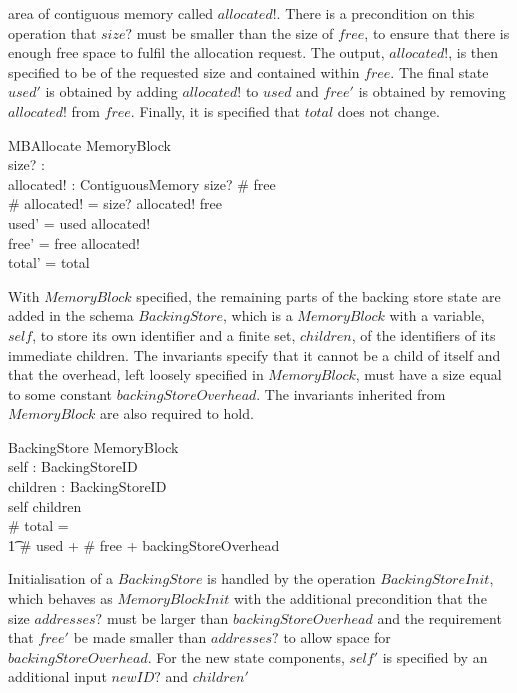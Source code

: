 \documentclass[a4paper,10pt]{article}
\begin{document}
area of contiguous memory called $allocated!$. There is a precondition on this
operation that $size?$ must be smaller than the size of $free$, to ensure that
there is enough free space to fulfil the allocation request. The output,
$allocated!$, is then specified to be of the requested size and contained within
$free$. The final state $used'$ is obtained by adding $allocated!$ to $used$ and
$free'$ is obtained by removing $allocated!$ from $free$. Finally, it is
specified that $total$ does not change.
%
\begin{schema}{MBAllocate}
  \Delta MemoryBlock \\
  size? : \nat \\
  allocated! : ContiguousMemory
\where
  size? \leq \# free \\
  \# allocated! = size? \land allocated! \subseteq free \\
  used' = used \cup allocated! \\
  free' = free \setminus allocated! \\
  total' = total \\
\end{schema}
%
With $MemoryBlock$ specified, the remaining parts of the backing store state are
added in the schema $BackingStore$, which is a $MemoryBlock$ with a variable,
$self$, to store its own identifier and a finite set, $children$, of the
identifiers of its immediate children. The invariants specify that it cannot be
a child of itself and that the overhead, left loosely specified in
$MemoryBlock$, must have a size equal to some constant
$backingStoreOverhead$. The invariants inherited from $MemoryBlock$ are also
required to hold.
%
\begin{schema}{BackingStore}
	MemoryBlock \\
  	self : BackingStoreID \\
  	children : \finset BackingStoreID \\
\where
 	self \notin children \\
 	\# total = \\
        \t1 \# used + \# free + backingStoreOverhead
\end{schema}
%
Initialisation of a $BackingStore$ is handled by the operation
$BackingStoreInit$, which behaves as $MemoryBlockInit$ with the additional
precondition that the size $addresses?$ must be larger than
$backingStoreOverhead$ and the requirement that $free'$ be made smaller than
$addresses?$ to allow space for $backingStoreOverhead$. For the new state
components, $self'$ is specified by an additional input $newID?$ and $children'$
\end{document}
